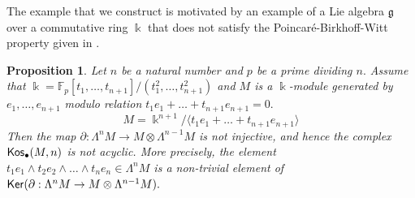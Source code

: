 \documentclass{amsart}
\numberwithin{equation}{section}
\newtheorem{proposition}[theorem]{Proposition}
\theoremstyle{definition}
\def\gg{\mathfrak{g}}
\def\kk{\Bbbk}
\begin{document}
The example that we construct is motivated by an example of a Lie algebra $\gg$
 over a commutative ring $\kk$ that does not satisfy  the Poincar\'e-Birkhoff-Witt property given in \cite[\S 5]{cohn1963remark}. 


\begin{proposition}\label{prop_counter_Kos} Let $n$ be a natural number and $p$ be a prime dividing $n.$ Assume that $\kk=\mathbb F_p[t_1,\dots,t_{n+1}]/(t_1^2,\dots,t_{n+1}^2)$ and $M$ is a $\kk$-module generated by $e_1,\dots,e_{n+1}$ modulo relation $t_1e_1+\dots+t_{n+1}e_{n+1}=0.$ 
$$M=\kk^{n+1}/\langle  t_1e_1+\dots+t_{n+1}e_{n+1} \rangle$$
Then the map
$\partial: \Lambda^nM\to M\otimes \Lambda^{n-1} M$
is not injective, and hence the complex ${\sf Kos}_\bullet(M,n)$ is not acyclic. More precisely, the element $t_1e_1 \wedge t_2e_2 \wedge \dots \wedge t_ne_n\in \Lambda^n M$ is a non-trivial element of  ${\sf Ker}(\partial: \Lambda^nM\to M\otimes \Lambda^{n-1} M).$  
\end{proposition}
\end{document}
